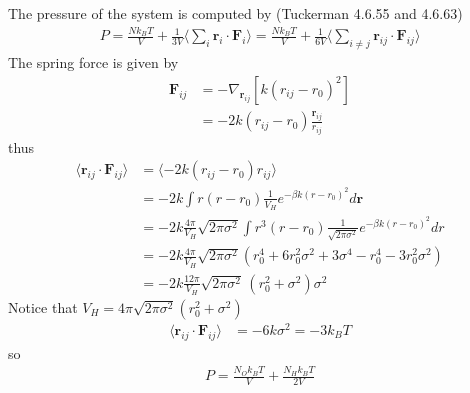 \documentclass[aps,pre,a4paper,showkeys,fleqn]{revtex4}
\begin{document}
The pressure of the system is computed by (Tuckerman 4.6.55 and 4.6.63)
\begin{align*}
  P
  = \frac{Nk_BT}{V} +
  \frac{1}{3V}
  \Big\langle
  \sum_i \bm r_i\cdot\bm F_i  
  \Big\rangle
  = \frac{Nk_BT}{V} +
  \frac{1}{6V}
  \Big\langle
  \sum_{i\neq j} \bm r_{ij}\cdot\bm F_{ij}
  \Big\rangle
\end{align*}
The spring force is given by
\begin{align*}
  \bm F_{ij}
  &=
    -\nabla_{\bm r_{ij}} [k (r_{ij} - r_0)^2] \\
  &=
    -2k(r_{ij} - r_0) \frac{\bm r_{ij}}{r_{ij}}
\end{align*}
thus
\begin{align*}
  \langle \bm r_{ij}\cdot\bm F_{ij} \rangle
  &=
    \langle -2k(r_{ij} - r_0)r_{ij} \rangle \\
  &=
    -2k \int r(r - r_0) \frac{1}{V_H} e^{-\beta k(r - r_0)^2} d\bm r \\
  &=
    -2k \frac{4\pi}{V_H} \sqrt{2\pi\sigma^2} \int r^3(r - r_0)\frac{1}{\sqrt{2\pi\sigma^2}} e^{-\beta k(r - r_0)^2} dr\\
  &=
    -2k \frac{4\pi}{V_H} \sqrt{2\pi\sigma^2} (r_0^4 + 6 r_0^2\sigma^2 + 3 \sigma^4 - r_0^4 - 3r_0^2\sigma^2 )\\
  &=
    -2k \frac{12\pi}{V_H} \sqrt{2\pi\sigma^2} \, ( r_0^2 + \sigma^2)\sigma^2
\end{align*}
Notice that $V_H = 4\pi\sqrt{2\pi\sigma^2} (r_0^2 + \sigma^2)$
\begin{align*}
  \langle \bm r_{ij}\cdot\bm F_{ij} \rangle
  &= -6k \sigma^2 = -3 k_BT
\end{align*}
so
\begin{align*}
  P = \frac{N_O k_BT}{V} + \frac{N_H k_BT}{2V}
\end{align*}

{}

\end{document}
